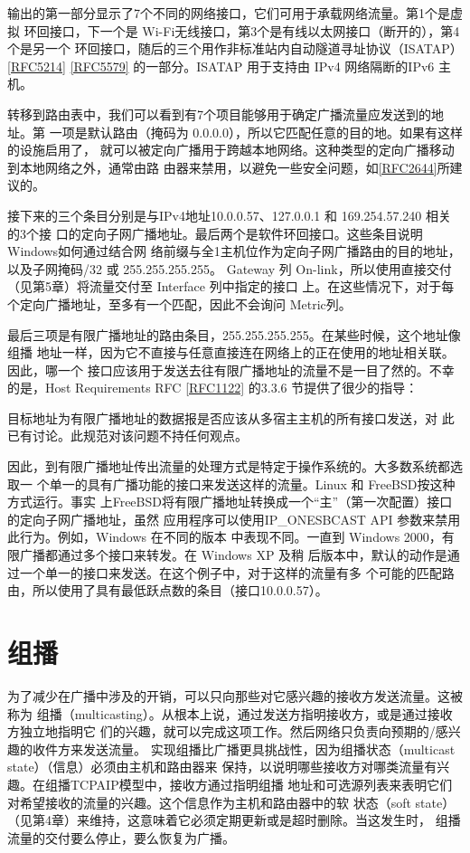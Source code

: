 \begin{verbatim}

\end{verbatim}

输出的第一部分显示了7个不同的网络接口，它们可用于承载网络流量。第1个是虚拟
环回接口，下一个是 Wi-Fi无线接口，第3个是有线以太网接口（断开的），第4个是另一个
环回接口，随后的三个用作非标准站内自动隧道寻址协议（ISATAP）\href{https://www.rfc-editor.org/rfc/rfc5214}{[RFC5214]} \href{https://www.rfc-editor.org/rfc/rfc5579}{[RFC5579]}
的一部分。ISATAP 用于支持由 IPv4 网络隔断的IPv6 主机。

转移到路由表中，我们可以看到有7个项目能够用于确定广播流量应发送到的地址。第
一项是默认路由（掩码为 0.0.0.0），所以它匹配任意的目的地。如果有这样的设施启用了，
就可以被定向广播用于跨越本地网络。这种类型的定向广播移动到本地网络之外，通常由路
由器来禁用，以避免一些安全问题，如\href{https://www.rfc-editor.org/rfc/rfc2644}{[RFC2644]}所建议的。

接下来的三个条目分别是与IPv4地址10.0.0.57、127.0.0.1 和 169.254.57.240 相关的3个接
口的定向子网广播地址。最后两个是软件环回接口。这些条目说明Windows如何通过结合网
络前缀与全1主机位作为定向子网广播路由的目的地址，以及子网掩码/32 或 255.255.255.255。
Gateway 列 On-link，所以使用直接交付（见第5章）将流量交付至 Interface 列中指定的接口
上。在这些情况下，对于每个定向广播地址，至多有一个匹配，因此不会询问 Metric列。

最后三项是有限广播地址的路由条目，255.255.255.255。在某些时候，这个地址像组播
地址一样，因为它不直接与任意直接连在网络上的正在使用的地址相关联。因此，哪一个
接口应该用于发送去往有限广播地址的流量不是一目了然的。不幸的是，Host Requirements
RFC \href{https://www.rfc-editor.org/rfc/rfc1122}{[RFC1122]} 的3.3.6 节提供了很少的指导：

目标地址为有限广播地址的数据报是否应该从多宿主主机的所有接口发送，对
此已有讨论。此规范对该问题不持任何观点。

因此，到有限广播地址传出流量的处理方式是特定于操作系统的。大多数系统都选取一
个单一的具有广播功能的接口来发送这样的流量。Linux 和 FreeBSD按这种方式运行。事实
上FreeBSD将有限广播地址转换成一个“主”（第一次配置）接口的定向子网广播地址，虽然
应用程序可以使用IP\_ONESBCAST API 参数来禁用此行为。例如，Windows 在不同的版本
中表现不同。一直到 Windows 2000，有限广播都通过多个接口来转发。在 Windows XP 及稍
后版本中，默认的动作是通过一个单一的接口来发送。在这个例子中，对于这样的流量有多
个可能的匹配路由，所以使用了具有最低跃点数的条目（接口10.0.0.57）。

\section{组播}
为了减少在广播中涉及的开销，可以只向那些对它感兴趣的接收方发送流量。这被称为
组播（multicasting）。从根本上说，通过发送方指明接收方，或是通过接收方独立地指明它
们的兴趣，就可以完成这项工作。然后网络只负责向预期的/感兴趣的收件方来发送流量。
实现组播比广播更具挑战性，因为组播状态（multicast state）（信息）必须由主机和路由器来
保持，以说明哪些接收方对哪类流量有兴趣。在组播TCPAIP模型中，接收方通过指明组播
地址和可选源列表来表明它们对希望接收的流量的兴趣。这个信息作为主机和路由器中的软
状态（soft state）（见第4章）来维持，这意味着它必须定期更新或是超时删除。当这发生时，
组播流量的交付要么停止，要么恢复为广播。

